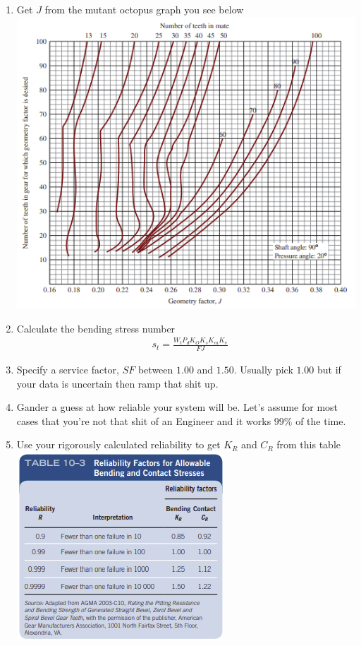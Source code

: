 \documentclass[11pt, fleqn]{article}
\begin{document}
\begin{enumerate}
    \item Get $J$ from the mutant octopus graph you see below\\
    \includegraphics[scale=1]{Gears/Fig 10-15.png}
    \item Calculate the bending stress number
    \begin{align*}
        &s_t=\frac{W_tP_dK_OK_sK_mK_v}{FJ}
    \end{align*}
    \item Specify a service factor, $SF$ between $1.00$ and $1.50$. Usually pick $1.00$ but if your data is uncertain then ramp that shit up.
    \item Gander a guess at how reliable your system will be. Let's assume for most cases that you're not that shit of an Engineer and it works $99\%$ of the time.
    \item Use your rigorously calculated reliability to get $K_R$ and $C_R$ from this table\\
    \includegraphics[scale=1]{Gears/10-3.png}

\end{enumerate}
\end{document}
